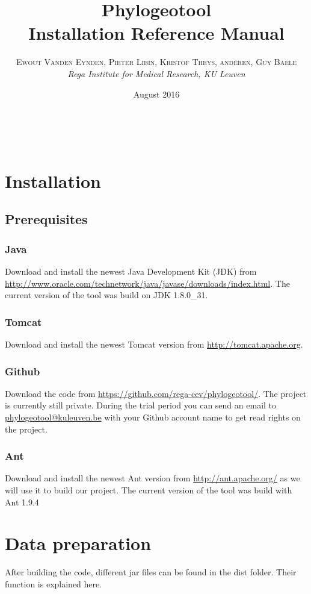\documentclass[a4paper, 11pt]{article} %
\title{\textbf{Phylogeotool}\\ %
Installation Reference Manual} %
\author{\textsc{Ewout Vanden Eynden, Pieter Libin, Kristof Theys, anderen, Guy Baele} %
\\{\textit{Rega Institute for Medical Research, KU Leuven}}} %
\date{August 2016} %
\makeatletter
\renewcommand{\maketitle}{ %
\begin{flushright} %
{\LARGE\@title} %

\vspace{50pt} %

{\large\@author} %
\\\@date %

\vspace{40pt} %
\end{flushright}
}
\makeatother
\begin{document}
\maketitle %

\vspace{30pt} %

\tableofcontents
\newpage

\section{Installation}
\subsection{Prerequisites}
\subsubsection*{Java}
Download and install the newest Java Development Kit (JDK) from \url{http://www.oracle.com/technetwork/java/javase/downloads/index.html}.
The current version of the tool was build on JDK 1.8.0\_31.
\subsubsection*{Tomcat}
Download and install the newest Tomcat version from \url{http://tomcat.apache.org}.
\subsubsection*{Github}
Download the code from \url{https://github.com/rega-cev/phylogeotool/}. The project is currently still private. During the trial period you can send an email to \href{mailto:phylogeotool@kuleuven.be}  {phylogeotool@kuleuven.be} with your Github account name to get read rights on the project.
\subsubsection*{Ant}
Download and install the newest Ant version from \url{http://ant.apache.org/} as we will use it to build our project.
The current version of the tool was build with Ant 1.9.4

\section{Data preparation}
After building the code, different jar files can be found in the dist folder. Their function is explained here.
\end{document}
